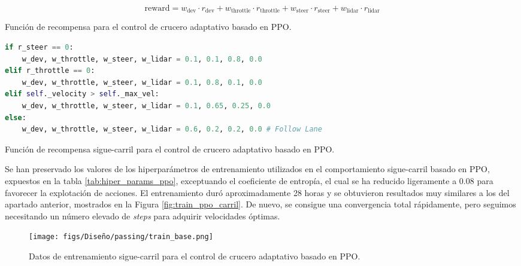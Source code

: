   \begin{myequation}[h]
    \begin{equation} 
      \text{reward} = w_{\text{dev}} \cdot r_{\text{dev}} + w_{\text{throttle}} \cdot r_{\text{throttle}} + w_{\text{steer}} \cdot r_{\text{steer}} + w_{\text{lidar}} \cdot r_{\text{lidar}}
    \end{equation} 
    \caption{Función de recompensa para el control de crucero adaptativo basado en \ac{PPO}.}
\label{eq:rew_ppo_adp}
  \end{myequation}

\begin{code}[H]
\begin{lstlisting}[language=Python]
if r_steer == 0:
    w_dev, w_throttle, w_steer, w_lidar = 0.1, 0.1, 0.8, 0.0
elif r_throttle == 0:
    w_dev, w_throttle, w_steer, w_lidar = 0.1, 0.8, 0.1, 0.0
elif self._velocity > self._max_vel:
    w_dev, w_throttle, w_steer, w_lidar = 0.1, 0.65, 0.25, 0.0
else:
    w_dev, w_throttle, w_steer, w_lidar = 0.6, 0.2, 0.2, 0.0 # Follow Lane
\end{lstlisting}
\caption[Función de recompensa sigue-carril para el control de crucero adaptativo con \ac{PPO}]{Función de recompensa sigue-carril para el control de crucero adaptativo basado en \ac{PPO}.}
\label{cod:rew_carril_ppo_passing}
\end{code}

Se han preservado los valores de los hiperparámetros de entrenamiento utilizados en el comportamiento sigue-carril basado en \ac{PPO}, expuestos en la tabla \ref{tab:hiper_params_ppo}, exceptuando el coeficiente de entropía, el cual se ha reducido ligeramente a 0.08 para favorecer la explotación de acciones. El entrenamiento duró aproximadamente 28 horas y se obtuvieron resultados muy similares a los del apartado anterior, mostrados en la Figura \ref{fig:train_ppo_carril}. De nuevo, se consigue una convergencia total rápidamente, pero seguimos necesitando un número elevado de \textit{steps} para adquirir velocidades óptimas.

\begin{figure}[ht]
\centering
\texttt{[image: figs/Diseño/passing/train\_base.png]}
\caption{Datos de entrenamiento sigue-carril para el control de crucero adaptativo basado en \ac{PPO}.}
\label{fig:passing_train_base}
\end{figure}

